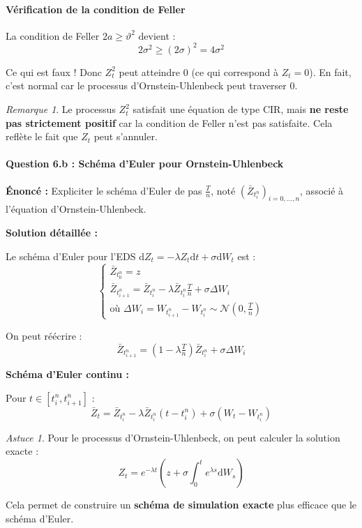 \documentclass[12pt,a4paper]{article}
\theoremstyle{definition}
\theoremstyle{remark}
\newtheorem*{remark}{Remarque}
\newtheorem*{astuce}{Astuce}
\newcommand{\dd}{\mathrm{d}}
\begin{document}
\paragraph{Vérification de la condition de Feller}

La condition de Feller $2a \geq \vartheta^2$ devient :
\[
2\sigma^2 \geq (2\sigma)^2 = 4\sigma^2
\]

Ce qui est faux ! Donc $Z_t^2$ peut atteindre $0$ (ce qui correspond à $Z_t = 0$). En fait, c'est normal car le processus d'Ornstein-Uhlenbeck peut traverser $0$.

\begin{remark}
Le processus $Z_t^2$ satisfait une équation de type CIR, mais \textbf{ne reste pas strictement positif} car la condition de Feller n'est pas satisfaite. Cela reflète le fait que $Z_t$ peut s'annuler.
\end{remark}

\paragraph{Question 6.b : Schéma d'Euler pour Ornstein-Uhlenbeck}

\textbf{Énoncé :} Expliciter le schéma d'Euler de pas $\frac{T}{n}$, noté $(\bar{Z}_{t_i^n})_{i=0,\ldots,n}$, associé à l'équation d'Ornstein-Uhlenbeck.

\textbf{Solution détaillée :}

Le schéma d'Euler pour l'EDS $\dd Z_t = -\lambda Z_t \dd t + \sigma \dd W_t$ est :
\begin{equation}
\boxed{
\begin{cases}
\bar{Z}_{t_0^n} = z \\
\bar{Z}_{t_{i+1}^n} = \bar{Z}_{t_i^n} - \lambda \bar{Z}_{t_i^n} \frac{T}{n} + \sigma \Delta W_i \\
\text{où } \Delta W_i = W_{t_{i+1}^n} - W_{t_i^n} \sim \mathcal{N}(0, \tfrac{T}{n})
\end{cases}
}
\end{equation}

On peut réécrire :
\[
\bar{Z}_{t_{i+1}^n} = (1 - \lambda \tfrac{T}{n})\bar{Z}_{t_i^n} + \sigma \Delta W_i
\]

\textbf{Schéma d'Euler continu :}

Pour $t \in [t_i^n, t_{i+1}^n]$ :
\[
\bar{Z}_t = \bar{Z}_{t_i^n} - \lambda \bar{Z}_{t_i^n}(t - t_i^n) + \sigma(W_t - W_{t_i^n})
\]

\begin{astuce}
Pour le processus d'Ornstein-Uhlenbeck, on peut calculer la solution exacte :
\[
Z_t = e^{-\lambda t}\left(z + \sigma \int_0^t e^{\lambda s}\dd W_s\right)
\]

Cela permet de construire un \textbf{schéma de simulation exacte} plus efficace que le schéma d'Euler.
\end{astuce}
\end{document}
